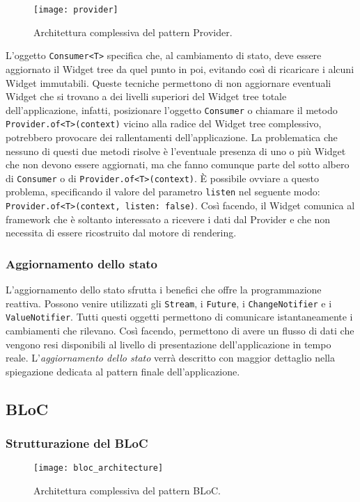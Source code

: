 \begin{figure}
	\begin{center}
		\texttt{[image: provider]}
		\caption[Provider - Architettura complessiva]{Architettura complessiva del pattern Provider\cite{provider_first}.}
		\label{figura:provider}
	\end{center}
\end{figure}

L'oggetto \verb|Consumer<T>| specifica che, al cambiamento di stato, deve essere aggiornato il Widget tree da quel punto in poi, evitando così di ricaricare i alcuni Widget immutabili. Queste tecniche permettono di non aggiornare eventuali Widget che si trovano a dei livelli superiori del Widget tree totale dell'applicazione, infatti, posizionare l'oggetto \verb|Consumer| o chiamare il metodo \verb|Provider.of<T>(context)| vicino alla radice del Widget tree complessivo, potrebbero provocare dei rallentamenti dell'applicazione. La problematica che nessuno di questi due metodi risolve è l'eventuale presenza di uno o più Widget che non devono essere aggiornati, ma che fanno comunque parte del sotto albero di \verb|Consumer| o di \verb|Provider.of<T>(context)|. È possibile ovviare a questo problema, specificando il valore del parametro \verb|listen| nel seguente modo: \verb|Provider.of<T>(context, listen: false)|. Così facendo, il Widget comunica al framework che è soltanto interessato a ricevere i dati dal Provider e che non necessita di essere ricostruito dal motore di rendering.

\subsubsection{Aggiornamento dello stato}
L'aggiornamento dello stato sfrutta i benefici che offre la programmazione reattiva. Possono venire utilizzati gli \verb|Stream|, i \verb|Future|, i \verb|ChangeNotifier| e i \verb|ValueNotifier|. Tutti questi oggetti permettono di comunicare istantaneamente i cambiamenti che rilevano. Così facendo, permettono di avere un flusso di dati che vengono resi disponibili al livello di presentazione dell'applicazione in tempo reale. L'\textit{aggiornamento dello stato} verrà descritto con maggior dettaglio nella spiegazione dedicata al pattern finale dell'applicazione.

\subsection{BLoC}
\subsubsection{Strutturazione del BLoC}
\begin{figure}
	\begin{center}
		\texttt{[image: bloc\_architecture]}
		\caption[BLoC - Architettura complessiva]{Architettura complessiva del pattern BLoC.}
		\label{figura:bloc_architecture}
	\end{center}
\end{figure}


